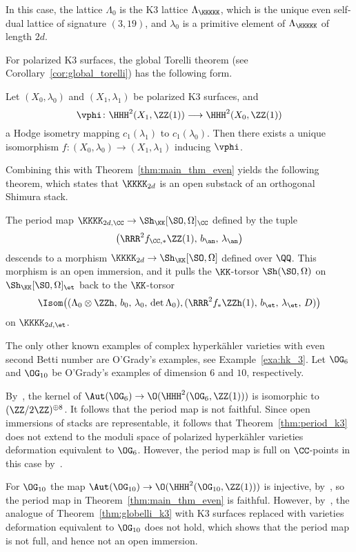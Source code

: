 In this case, the lattice $\Lambda_0$ is the K3 lattice $\Lambda_{\KKKKK}$, which is the unique even self-dual lattice of signature $(3,19)$, and $\lambda_0$ is a primitive element of $\Lambda_{\KKKKK}$ of length $2d$.

For polarized K3 surfaces, the global Torelli theorem (see Corollary~\ref{cor:global_torelli}) has the following form.
\begin{theorem}\label{thm:globelli_k3}
Let $(X_0,\lambda_0)$ and $(X_1,\lambda_1)$ be polarized K3 surfaces, and 
$$
\vphi\colon \HHH^2(X_1,\ZZ(1)) \longrightarrow \HHH^2(X_0,\ZZ(1))
$$ 
a Hodge isometry mapping $c_1(\lambda_1)$ to $c_1(\lambda_0)$. Then there exists a unique isomorphism $f\colon (X_0,\lambda_0) \rightarrow (X_1,\lambda_1)$ inducing $\vphi$.
\end{theorem}

Combining this with Theorem~\ref{thm:main_thm_even} yields the following theorem, which states that $\KKKK_{2d}$ is an open substack of an orthogonal Shimura stack.
\begin{theorem}\label{thm:period_k3}
The period map $\KKKK_{2d,\CC} \rightarrow \Sh_{\KK}[\SO,\Omega]_{\CC}$ defined by the tuple
$$
\left(\RRR^2 f_{\CC,*} \ZZ(1),\, b_{\an},\, \lambda_{\an}\right)
$$
descends to a morphism $\KKKK_{2d} \rightarrow \Sh_{\KK}[\SO,\Omega]$ defined over $\QQ$. This morphism is an open immersion, and it pulls the $\KK$-torsor $\Sh(\SO,\Omega)$ on $\Sh_{\KK}[\SO,\Omega]_{\et}$ back to the $\KK$-torsor
$$
\Isom\!\left((\Lambda_0 \otimes \ZZh,\, b_0,\, \lambda_0,\, \det \Lambda_0), (\RRR^2 f_* \ZZh(1),\, b_{\et},\, \lambda_{\et},\, D)\right)
$$
on $\KKKK_{2d,\et}$.
\end{theorem}

\begin{remark}
The only other known examples of complex hyperk\"ahler varieties with even second Betti number are O'Grady's examples, see Example~\ref{exa:hk_3}. Let $\OG_6$ and $\OG_{10}$ be O'Grady's examples of dimension $6$ and $10$, respectively.

By~\cite[Theorem~5.2]{MongardiWandel}, the kernel of $\Aut(\OG_6) \rightarrow \O(\HHH^2(\OG_6,\ZZ(1)))$ is isomorphic to $(\ZZ/2\ZZ)^{\oplus 8}$. It follows that the period map is not faithful. Since open immersions of stacks are representable, it follows that Theorem~\ref{thm:period_k3} does not extend to the moduli space of polarized hyperk\"ahler varieties deformation equivalent to $\OG_6$. However, the period map is full on $\CC$-points in this case by~\cite[Theorem~5.4]{MongardiRapagnetta}.

For $\OG_{10}$ the map $\Aut(\OG_{10}) \rightarrow \O(\HHH^2(\OG_{10},\ZZ(1)))$ is injective, by~\cite[Theorem~3.1]{MongardiWandel}, so the period map in Theorem~\ref{thm:main_thm_even} is faithful. However, by~\cite[Theorem~5.3]{Mongardi}, the analogue of Theorem~\ref{thm:globelli_k3} with K3 surfaces replaced with varieties deformation equivalent to $\OG_{10}$ does not hold, which shows that the period map is not full, and hence not an open immersion.
\end{remark}

